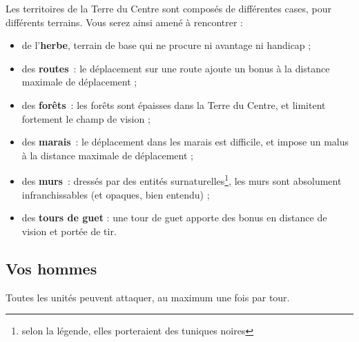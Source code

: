 Les territoires de la Terre du Centre sont composés de différentes
cases, pour différents terrains. Vous serez ainsi amené à rencontrer :

\begin{itemize}
  \item de l'\textbf{herbe}, terrain de base qui ne procure ni
    avantage ni handicap ;
  \item des \textbf{routes}~: le déplacement sur une route ajoute un
    bonus à la distance maximale de déplacement ;
  \item des \textbf{forêts}~: les forêts sont épaisses dans la Terre du
    Centre, et limitent fortement le champ de vision ;
  \item des \textbf{marais}~: le déplacement dans les marais est
    difficile, et impose un malus à la distance maximale de
    déplacement ;
  \item des \textbf{murs}~: dressés par des entités
    surnaturelles\footnote{selon la légende, elles porteraient des
      tuniques noires}, les murs sont absolument infranchissables (et
    opaques, bien entendu) ;
  \item des \textbf{tours de guet} : une tour de guet apporte des
    bonus en distance de vision et portée de tir.
\end{itemize}

\subsection{Vos hommes}
\prolocitation{}

Toutes les unités peuvent attaquer, au maximum une fois par tour.

